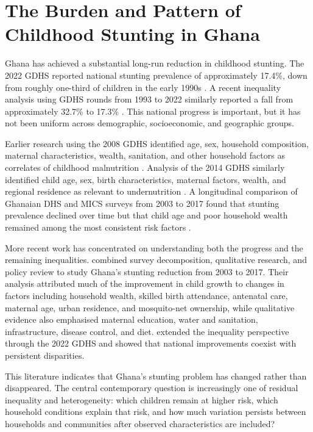 \section{The Burden and Pattern of Childhood Stunting in Ghana}

Ghana has achieved a substantial long-run reduction in childhood stunting. The 2022 GDHS reported national stunting prevalence of approximately 17.4\%, down from roughly one-third of children in the early 1990s \cite{GSSICF2024}. A recent inequality analysis using GDHS rounds from 1993 to 2022 similarly reported a fall from approximately 32.7\% to 17.3\% \cite{OsborneEtAl2025}. This national progress is important, but it has not been uniform across demographic, socioeconomic, and geographic groups.

Earlier research using the 2008 GDHS identified age, sex, household composition, maternal characteristics, wealth, sanitation, and other household factors as correlates of childhood malnutrition \cite{DartehEtAl2014,AhetoEtAl2015}. Analysis of the 2014 GDHS similarly identified child age, sex, birth characteristics, maternal factors, wealth, and regional residence as relevant to undernutrition \cite{BoahEtAl2019}. A longitudinal comparison of Ghanaian DHS and MICS surveys from 2003 to 2017 found that stunting prevalence declined over time but that child age and poor household wealth remained among the most consistent risk factors \cite{SeworJayalakshmi2024}.

More recent work has concentrated on understanding both the progress and the remaining inequalities. \citet{OtooEtAl2025} combined survey decomposition, qualitative research, and policy review to study Ghana's stunting reduction from 2003 to 2017. Their analysis attributed much of the improvement in child growth to changes in factors including household wealth, skilled birth attendance, antenatal care, maternal age, urban residence, and mosquito-net ownership, while qualitative evidence also emphasised maternal education, water and sanitation, infrastructure, disease control, and diet. \citet{OsborneEtAl2025} extended the inequality perspective through the 2022 GDHS and showed that national improvements coexist with persistent disparities.

This literature indicates that Ghana's stunting problem has changed rather than disappeared. The central contemporary question is increasingly one of residual inequality and heterogeneity: which children remain at higher risk, which household conditions explain that risk, and how much variation persists between households and communities after observed characteristics are included?

